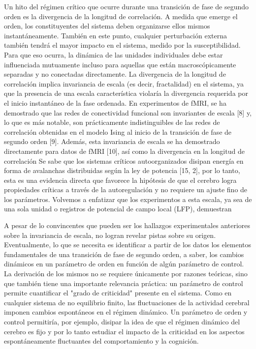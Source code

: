 Un hito del régimen crítico que ocurre durante una transición de fase de segundo orden es la divergencia de la longitud de correlación. A medida que emerge el orden, los constituyentes del sistema deben organizarse ellos mismos instantáneamente. También en este punto, cualquier perturbación externa también tendrá el mayor impacto en el sistema, medido por la susceptibilidad. Para que eso ocurra, la dinámica de las unidades individuales debe estar influenciada mutuamente incluso para aquellas que están macroscópicamente separadas y no conectadas directamente. La divergencia de la longitud de correlación implica invariancia de escala (es decir, fractalidad) en el sistema, ya que la presencia de una escala característica violaría la divergencia requerida por el inicio instantáneo de la fase ordenada. En experimentos de fMRI, se ha demostrado que las redes de conectividad funcional son invariantes de escala [8] y, lo que es más notable, son prácticamente indistinguibles de las redes de correlación obtenidas en el modelo Ising al inicio de la transición de fase de segundo orden [9]. Además, esta invariancia de escala se ha demostrado directamente para datos de fMRI [10], así como la divergencia en la longitud de correlación
Se sabe que los sistemas críticos autoorganizados disipan energía en forma de avalanchas distribuidas según la ley de potencia [15, 2], por lo tanto, esta es una evidencia directa que favorece la hipótesis de que el cerebro logra propiedades críticas a través de la autoregulación y no requiere un ajuste fino de los parámetros. Volvemos a enfatizar que los experimentos a esta escala, ya sea de una sola unidad o registros de potencial de campo local (LFP), demuestran

A pesar de lo convincentes que pueden ser los hallazgos experimentales anteriores sobre la invariancia de escala, no logran revelar pistas sobre su origen. Eventualmente, lo que se necesita es identificar a partir de los datos los elementos fundamentales de una transición de fase de segundo orden, a saber, los cambios dinámicos en un parámetro de orden en función de algún parámetro de control. La derivación de los mismos no se requiere únicamente por razones teóricas, sino que también tiene una importante relevancia práctica: un parámetro de control permite cuantificar el "grado de criticidad" presente en el sistema. Como en cualquier sistema de no equilibrio finito, las fluctuaciones de la actividad cerebral imponen cambios espontáneos en el régimen dinámico. Un parámetro de orden y control permitiría, por ejemplo, disipar la idea de que el régimen dinámico del cerebro es fijo y por lo tanto estudiar el impacto de la criticidad en los aspectos espontáneamente fluctuantes del comportamiento y la cognición.


